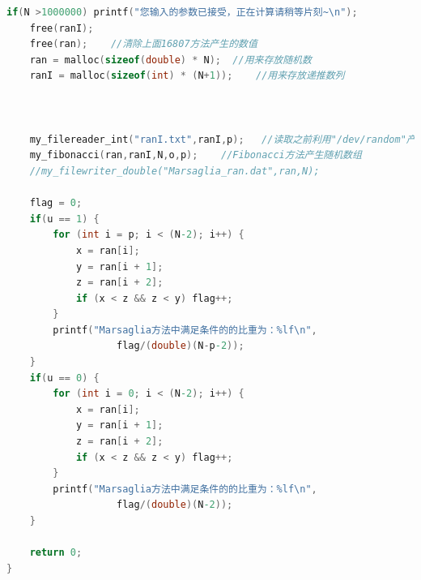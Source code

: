 \documentclass[a4paper,11pt]{article}
\begin{document}
\begin{appendices}
\begin{lstlisting}[language = C]
    if(N >1000000) printf("您输入的参数已接受，正在计算请稍等片刻~\n");
    free(ranI);
    free(ran);    //清除上面16807方法产生的数值
    ran = malloc(sizeof(double) * N);  //用来存放随机数
    ranI = malloc(sizeof(int) * (N+1));    //用来存放递推数列



    my_filereader_int("ranI.txt",ranI,p);   //读取之前利用"/dev/random"产生的初始随机数组
    my_fibonacci(ran,ranI,N,o,p);    //Fibonacci方法产生随机数组
    //my_filewriter_double("Marsaglia_ran.dat",ran,N);

    flag = 0;
    if(u == 1) {
        for (int i = p; i < (N-2); i++) {
            x = ran[i];
            y = ran[i + 1];
            z = ran[i + 2];
            if (x < z && z < y) flag++;
        }
        printf("Marsaglia方法中满足条件的的比重为：%lf\n",
        	       flag/(double)(N-p-2));
    }
    if(u == 0) {
        for (int i = 0; i < (N-2); i++) {
            x = ran[i];
            y = ran[i + 1];
            z = ran[i + 2];
            if (x < z && z < y) flag++;
        }
        printf("Marsaglia方法中满足条件的的比重为：%lf\n",
        	       flag/(double)(N-2));
    }

    return 0;
}

\end{lstlisting}


\end{appendices}
\end{document}
